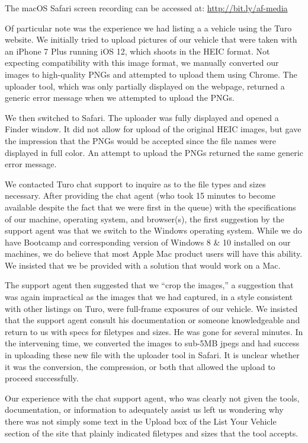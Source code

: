 \documentclass[review,12pt]{elsarticle}
\begin{document}
  The macOS Safari screen recording can be accessed at: \url{http://bit.ly/af-media}

  Of particular note was the experience we had listing a a vehicle using the Turo website. We initially tried to upload pictures of our vehicle that were taken with an iPhone 7 Plus running iOS 12, which shoots in the HEIC format. Not expecting compatibility with this image format, we manually converted our images to high-quality PNGs and attempted to upload them using Chrome. The uploader tool, which was only partially displayed on the webpage, returned a generic error message when we attempted to upload the PNGs.

  We then switched to Safari. The uploader was fully displayed and opened a Finder window. It did not allow for upload of the original HEIC images, but gave the impression that the PNGs would be accepted since the file names were displayed in full color. An attempt to upload the PNGs returned the same generic error message.

  We contacted Turo chat support to inquire as to the file types and sizes necessary. After providing the chat agent (who took 15 minutes to become available despite the fact that we were first in the queue) with the specifications of our machine, operating system, and browser(s), the first suggestion by the support agent was that we switch to the Windows operating system. While we do have Bootcamp and corresponding version of Windows 8 & 10 installed on our machines, we do believe that most Apple Mac product users will have this ability. We insisted that we be provided with a solution that would work on a Mac.

  The support agent then suggested that we ``crop the images,'' a suggestion that was again impractical as the images that we had captured, in a style consistent with other listings on Turo, were full-frame exposures of our vehicle. We insisted that the support agent consult his documentation or someone knowledgeable and return to us with specs for filetypes and sizes. He was gone for several minutes. In the intervening time, we converted the images to sub-5MB jpegs and had success in uploading these new file with the uploader tool in Safari. It is unclear whether it was the conversion, the compression, or both that allowed the upload to proceed successfully.

  Our experience with the chat support agent, who was clearly not given the tools, documentation, or information to adequately assist us left us wondering why there was not simply some text in the Upload box of the List Your Vehicle section of the site that plainly indicated filetypes and sizes that the tool accepts.
\end{document}
